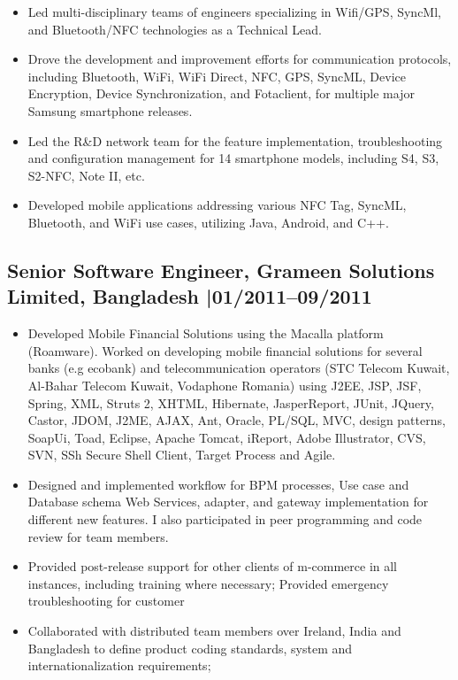 \documentclass[12pt,parskip=half]{scrartcl}
\begin{document}
\begin{itemize}
 \item Led multi-disciplinary teams of engineers specializing in Wifi/GPS, SyncMl, and Bluetooth/NFC technologies as a Technical Lead.
 \item Drove the development and improvement efforts for communication protocols, including Bluetooth, WiFi, WiFi Direct, NFC, GPS, SyncML, Device Encryption, Device Synchronization, and Fotaclient, for multiple major Samsung smartphone releases.
 \item Led the R\&D network team for the feature implementation, troubleshooting and configuration management for 14 smartphone models, including S4, S3, S2-NFC, Note II, etc.
 \item Developed mobile applications addressing various NFC Tag, SyncML, Bluetooth, and WiFi use cases, utilizing Java, Android, and C++.
 
\end{itemize}

\vspace{0.3cm}

\subsection*{Senior Software Engineer, Grameen Solutions Limited, Bangladesh |01/2011--09/2011}
\begin{itemize}
    \item Developed Mobile Financial Solutions using the Macalla platform (Roamware). Worked on developing mobile financial solutions for several banks (e.g ecobank) and telecommunication operators (STC Telecom Kuwait, Al-Bahar Telecom Kuwait, Vodaphone Romania) using J2EE, JSP, JSF, Spring, XML, Struts 2, XHTML, Hibernate, JasperReport, JUnit, JQuery, Castor, JDOM, J2ME, AJAX, Ant, Oracle, PL/SQL, MVC, design patterns, SoapUi, Toad, Eclipse, Apache Tomcat, iReport, Adobe Illustrator, CVS, SVN, SSh Secure Shell Client, Target Process and Agile.
   \item 	Designed and implemented workflow for BPM processes, Use case and Database schema Web Services, adapter, and gateway implementation for different new features. I also participated in peer programming and code review for team members. 
   \item 	Provided post-release support for other clients of m-commerce in all instances, including training where necessary; Provided emergency troubleshooting for customer
   \item 	 Collaborated with distributed team members over Ireland, India and Bangladesh to define product coding standards, system and internationalization requirements;


\end{itemize}
\end{document}
